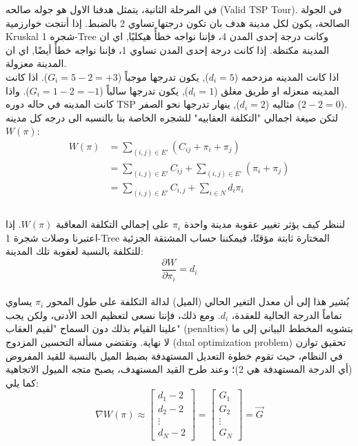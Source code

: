 \documentclass{article}
\newcommand{\en}[1]{\textenglish{#1}}
\begin{document}
في المرحلة الثانية، يتمثل هدفنا الاول هو جوله صالحه (\en{Valid TSP Tour}). في الجولة الصالحة، يكون لكل مدينة هدف بان تكون درجتها تساوي 2 بالضبط. إذا أنتجت خوارزمية \en{Kruskal} شجره \en{1-Tree} وكانت درجة إحدى المدن 4، فإننا نواجه خطأً هيكليًا, اي ان المدينة مكتظة. إذا كانت درجة إحدى المدن تساوي 1، فإننا نواجه خطأً أيضًا, اي ان المدينة معزولة.\\

اذا كانت المدينه مزدحمه ($d_i = 5$), يكون تدرجها موجباً ($G_i = 5 - 2 = +3$). اذا كانت المدينه منعزله او طريق مغلق ($d_i = 1$), يكون تدرجها سالباً ($G_i = 1 - 2 = -1$). واذا كانت المدينه في حاله دوره \en{TSP} مثاليه ($d_i = 2$), ينهار تدرجها نحو الصفر ($2-2=0$).\\

لتكن صيغة اجمالي "التكلفة العقابيه" للشجره الخاصة بنا بالنسبه الى درجه كل مدينه $W(\pi)$:\\

{\LARGE$$
\begin{aligned}
	W(\pi) 	&= \sum_{(i,j) \in E'} (C_{ij} + \pi_i + \pi_j) \\
			&= \sum_{(i,j) \in E'} C_{ij} + \sum_{(i,j) \in E'} (\pi_i + \pi_j) \\
			&= \sum_{(i,j) \in E'} C_{i,j} + \sum_{i \in N} d_i\pi_i \\
\end{aligned}
$$}\\

لننظر كيف يؤثر تغيير عقوبة مدينة واحدة $\pi_i$ على إجمالي التكلفة المعاقبة $W(\pi)$. إذا اعتبرنا وصلات شجرة \en{1-Tree} المختارة ثابتة مؤقتًا، فيمكننا حساب المشتقة الجزئية للتكلفة بالنسبة لعقوبة تلك المدينة:\\

{\LARGE$$
	\frac{\partial W}{\partial \pi_i} = d_i
$$}\\

يُشير هذا إلى أن معدل التغير الحالي (الميل) لدالة التكلفة على طول المحور $\pi_i$ يساوي تماماً الدرجة الحالية للعقدة، $d_i$. ومع ذلك، فإننا نسعى لتعظيم الحد الأدنى، ولكن يجب علينا القيام بذلك دون السماح "لقيم العقاب" (\en{penalties}) بتشويه المخطط البياني إلى ما لا نهاية. وتقتضي مسألة التحسين المزدوج (\en{dual optimization problem}) تحقيق توازن في النظام، حيث تقوم خطوة التعديل المستهدفة بضبط الميل بالنسبة للقيد المفروض (أي الدرجة المستهدفة هي 2)؛ وعند طرح القيد المستهدف، يصبح متجه الميول الاتجاهية كما يلي:\\


$$
	\nabla W(\pi) \approx
	\begin{bmatrix}
		d_1 - 2 \\
		d_2 - 2 \\
		\vdots  \\
		d_N - 2
	\end{bmatrix}
	=
	\begin{bmatrix}
		G_1    \\
		G_2    \\
		\vdots \\
		G_N
	\end{bmatrix}
	=
	\vec{G}
$$\\
\end{document}
